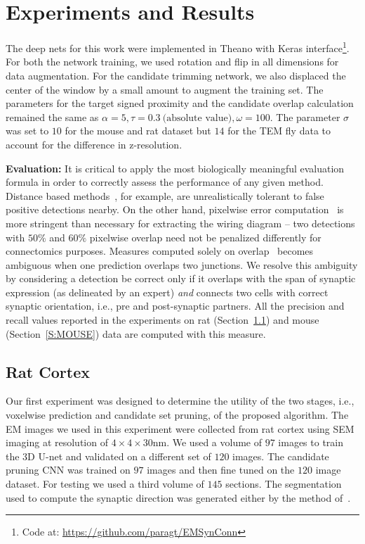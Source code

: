 \documentclass{llncs}
\begin{document}
\section{Experiments and Results}\label{S:EXPT}
The deep nets for this work were implemented in Theano with Keras interface\footnote{\scriptsize Code at: \url{https://github.com/paragt/EMSynConn}}. For both the network training, we used rotation and flip in all dimensions for data augmentation. For the candidate trimming network, we also displaced the center of the window by a small amount to augment the training set. The parameters for the target signed proximity and the candidate overlap calculation remained the same as $\alpha = 5, \tau = 0.3~\text{(absolute value)}, \omega = 100$. The parameter  $\sigma$ was set to $10$ for the mouse and rat dataset but $14$ for the TEM fly data to account for the difference in z-resolution. 

\noindent \textbf{Evaluation:} It is critical to apply the most biologically meaningful evaluation formula in order to correctly assess the performance of any given method. Distance based methods~\cite{staffler17synem}\cite{becker13syn}, for example, are unrealistically tolerant to false positive detections nearby. On the other hand, pixelwise error computation~\cite{cremi} is more stringent than necessary for extracting the wiring diagram -- two detections with $50\%$ and $60\%$ pixelwise overlap need not be penalized differently for connectomics purposes. Measures computed solely on overlap~\cite{roncal14vesicle} becomes ambiguous when one prediction overlaps two junctions. We resolve this ambiguity by considering a detection be correct only if it overlaps with the span of synaptic expression (as delineated by an expert) \emph{and} connects two cells with correct synaptic orientation, i.e., pre and post-synaptic partners. All the precision and recall values reported in the experiments on rat (Section~\ref{S:RAT}) and mouse (Section~\ref{S:MOUSE}) data are computed with this measure.

 
\subsection{Rat Cortex}\label{S:RAT}
Our first experiment was designed to determine the utility of the two stages, i.e., voxelwise prediction and candidate set pruning, of the  proposed algorithm. The EM images we used in this experiment were collected from rat cortex using SEM imaging at resolution of $4\times 4\times 30$nm. We used a volume of $97$ images to train the 3D U-net and validated on a different set of $120$ images. The candidate pruning CNN was trained on $97$ images and then fine tuned on the $120$ image dataset. For testing we used a third volume of $145$ sections. The segmentation used to compute the synaptic direction was generated either by the method of~\cite{parag17arxiv}.
\end{document}
